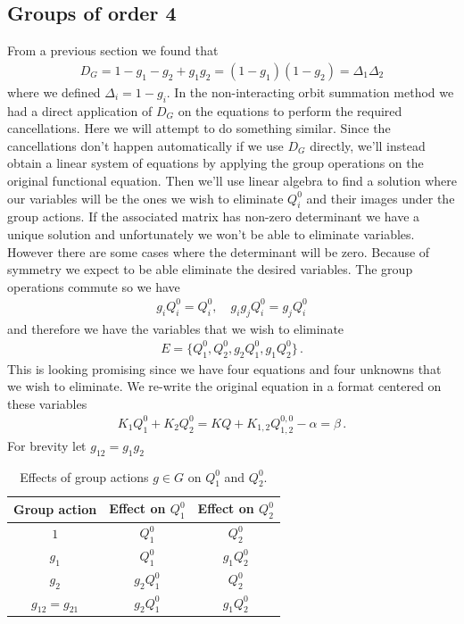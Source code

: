 \subsection{Groups of order 4}
From a previous section we found that
\begin{align}
	D_G = 1-g_1-g_2+g_1g_2 = (1-g_1)(1-g_2) = \Delta_1\Delta_2
\end{align}
where we defined $\Delta_i = 1- g_i$. In the non-interacting orbit summation method we had a direct application of $D_G$ on the equations to perform the required cancellations. Here we will attempt to do something similar. Since the cancellations don't happen automatically if we use $D_G$ directly, we'll instead obtain a linear system of equations by applying the group operations on the original functional equation. Then we'll use linear algebra to find a solution where our variables will be the ones we wish to eliminate $Q_i^0$ and their images under the group actions. If the associated matrix has non-zero determinant we have a unique solution and unfortunately we won't be able to eliminate variables. However there are some cases where the determinant will be zero. Because of symmetry we expect to be able eliminate the desired variables. The group operations commute so we have
\begin{align}
	g_i Q_i^0 = Q_i^0,\quad g_ig_j Q_i^0 = g_j Q_i^0
\end{align}
and therefore we have the variables that we wish to eliminate
\begin{align}
	E = \{Q_1^0,Q_2^0,g_2Q_1^0,g_1Q_2^0\}\,.
\end{align}
This is looking promising since we have four equations and four unknowns that we wish to eliminate. We re-write the original equation in a format centered on these variables
\begin{align}
	 K_1 Q_1^0 +  K_2 Q_2^0 = KQ + K_{1,2}Q_{1,2}^{0,0} -\alpha = \beta\,.
\end{align}
For brevity let $g_{12} = g_1g_2$
\begin{table}[H]
\caption{Effects of group actions $g\in G$ on $Q_1^0$ and $Q_2^0$.}
\label{tbl:actions4}
\centering
\begin{tabular}{ccc}
\toprule
	Group action & Effect on $Q_1^0$ & Effect on $Q_2^0$\\
\midrule
	$1$ & $Q_1^0$ & $Q_2^0$\\
	$g_1$ & $Q_1^0$ & $g_1Q_2^0$ \\
	$g_2$ & $g_2Q_1^0$ & $Q_2^0$ \\
	$g_{12}=g_{21}$ & $g_2Q_1^0$ & $g_1Q_2^0$ \\
\bottomrule
\end{tabular}
\end{table}
